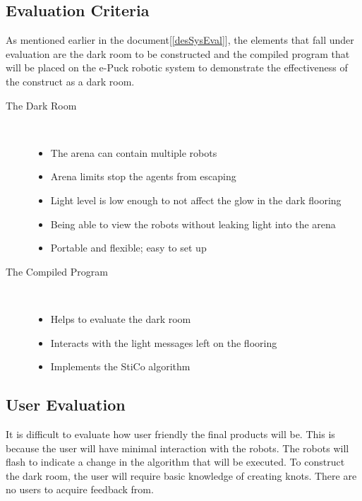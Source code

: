 \subsection{Evaluation Criteria} \label{desEvalCrit}
As mentioned earlier in the document[\ref{desSysEval}], the elements that fall
under evaluation are the dark room to be constructed and the compiled program
that will be placed on the e-Puck robotic system to demonstrate the 
effectiveness of the construct as a dark room.

\begin{description}
  \item[The Dark Room] \hfill \\
  \begin{itemize}
    \item The arena can contain multiple robots
    \item Arena limits stop the agents from escaping
    \item Light level is low enough to not affect the glow in the dark flooring
    \item Being able to view the robots without leaking light into the arena
    \item Portable and flexible; easy to set up
  \end{itemize}
  \item[The Compiled Program] \hfill \\
  \begin{itemize}
    \item Helps to evaluate the dark room
    \item Interacts with the light messages left on the flooring
    \item Implements the StiCo algorithm
  \end{itemize}
\end{description}

\subsection{User Evaluation} \label{desEvalUser}
It is difficult to evaluate how user friendly the final products will be.  This
is because the user will have minimal interaction with the robots.  The robots
will flash to indicate a change in the algorithm that will be executed.  To
construct the dark room, the user will require basic knowledge of creating
knots.  There are no users to acquire feedback from.

